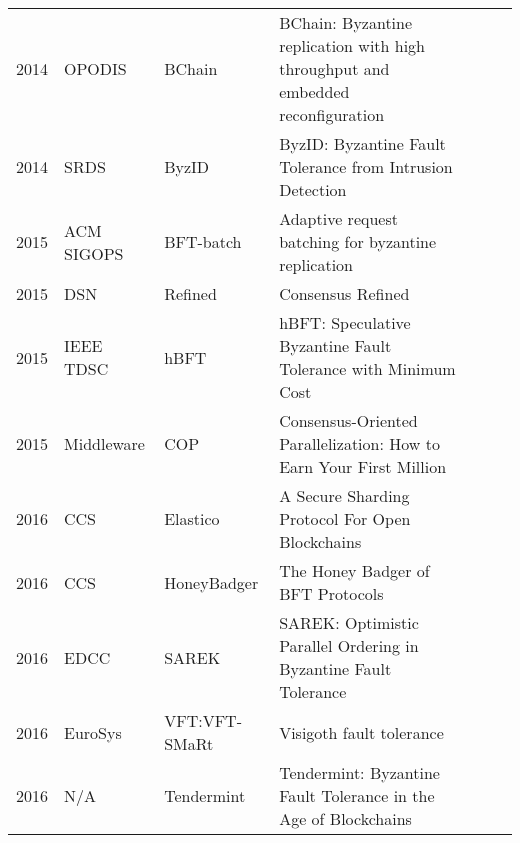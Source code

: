\documentclass{article}
\begin{document}
\begin{landscape}
\begin{table}[]
{\begin{tabular}{llll|l|l|l|}
2014 & OPODIS            & BChain                  & BChain: Byzantine replication with high throughput and embedded reconfiguration           &            &          &              \\ \cline{5-7} 
2014 & SRDS              & ByzID                   & ByzID: Byzantine Fault Tolerance from Intrusion Detection                                 &            &          &              \\ \cline{5-7} 
2015 & ACM SIGOPS        & BFT-batch               & Adaptive request batching for byzantine replication                                       &            &          &              \\ \cline{5-7} 
2015 & DSN               & Refined                 & Consensus Refined                                                                         &            &          &              \\ \cline{5-7} 
2015 & IEEE TDSC         & hBFT                    & hBFT: Speculative Byzantine Fault Tolerance with Minimum Cost                             &            &          &              \\ \cline{5-7} 
2015 & Middleware        & COP                     & Consensus-Oriented Parallelization: How to Earn Your First Million                        &            &          &              \\ \cline{5-7} 
2016 & CCS               & Elastico                & A Secure Sharding Protocol For Open Blockchains                                           &            &          &              \\ \cline{5-7} 
2016 & CCS               & HoneyBadger             & The Honey Badger of BFT Protocols                                                         &            &          &              \\ \cline{5-7} 
2016 & EDCC              & SAREK                   & SAREK: Optimistic Parallel Ordering in Byzantine Fault Tolerance                          &            &          &              \\ \cline{5-7} 
2016 & EuroSys           & VFT:VFT-SMaRt           & Visigoth fault tolerance                                                                  &            &          &              \\ \cline{5-7} 
2016 & N/A               & Tendermint              & Tendermint: Byzantine Fault Tolerance in the Age of Blockchains                           &            &          &              \\ \cline{5-7} 

\end{tabular}}
\end{table}
\end{landscape}
\end{document}
